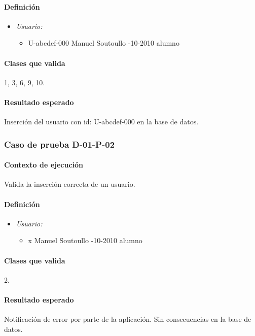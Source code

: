 \documentclass[10pt,a4paper]{article}
\begin{document}
				\paragraph{Definición}
				\begin{itemize}
					\item \textit{Usuario:}
					\begin{itemize}
						\item \textbar  U-abcdef-000 \textbar Manuel \textbar Soutoullo -10-2010 \textbar alumno \textbar
					\end{itemize}
				\end{itemize}
				\paragraph{Clases que valida} 1, 3, 6, 9, 10.
				\paragraph{Resultado esperado} Inserción del usuario con id: U-abcdef-000 en la base de datos.
			\subsubsection{Caso de prueba D-01-P-02}
				\paragraph{Contexto de ejecución} Valida la inserción correcta de un usuario.
				\paragraph{Definición}
				\begin{itemize}
					\item \textit{Usuario:}
					\begin{itemize}
						\item \textbar x \textbar Manuel \textbar Soutoullo -10-2010 \textbar alumno \textbar
					\end{itemize}
				\end{itemize}
				\paragraph{Clases que valida} 2.
				\paragraph{Resultado esperado} Notificación de error por parte de la aplicación. Sin consecuencias en la base de datos.
\end{document}
